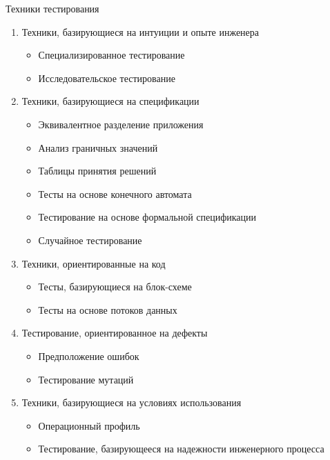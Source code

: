 \documentclass[xcolor=table]{beamer}
\begin{document}
\begin{frame}{Техники тестирования}
	\begin{enumerate}
		\item Техники, базирующиеся на интуиции и опыте инженера 
		\begin{itemize}
			\item Специализированное тестирование
			\item Исследовательское тестирование
		\end{itemize}
		\item Техники, базирующиеся на спецификации
		\begin{itemize}
			\item Эквивалентное разделение приложения
			\item Анализ граничных значений
			\item Таблицы принятия решений
			\item Тесты на основе конечного автомата
			\item Тестирование на основе формальной спецификации
			\item Случайное тестирование
		\end{itemize}		
		\item Техники, ориентированные на код
		\begin{itemize}
			\item Тесты, базирующиеся на блок-схеме 
			\item Тесты на основе потоков данных 
		\end{itemize}		
		\item Тестирование, ориентированное на дефекты 
		\begin{itemize}
			\item Предположение ошибок 
			\item Тестирование мутаций 
		\end{itemize}				
		\item Техники, базирующиеся на условиях использования
		\begin{itemize}
			\item Операционный профиль
			\item Тестирование, базирующееся на надежности инженерного процесса
		\end{itemize}	
	\end{enumerate}
\end{frame}
\end{document}
